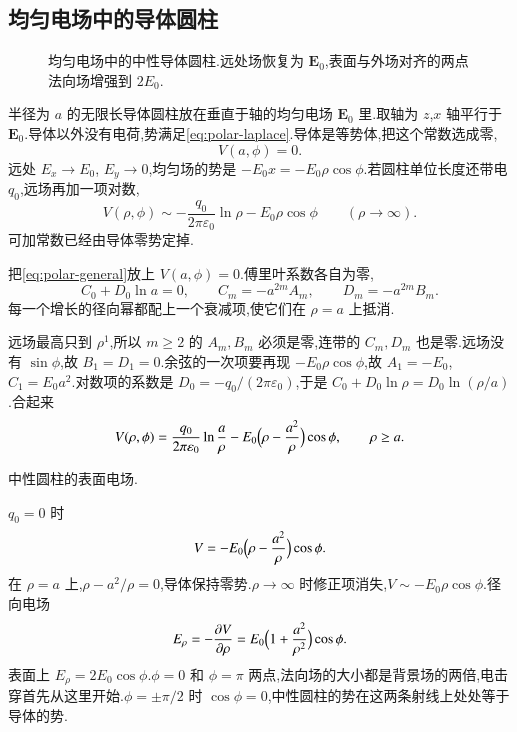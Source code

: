 \subsection{均匀电场中的导体圆柱}

\begin{figure}[htb]
  \centering
  
  \caption{均匀电场中的中性导体圆柱.远处场恢复为 $\mathbf{E}_0$,表面与外场对齐的两点法向场增强到 $2E_0$.}
  \label{fig:cylinder-field}
\end{figure}

半径为 $a$ 的无限长导体圆柱放在垂直于轴的均匀电场 $\mathbf{E}_0$ 里.取轴为 $z$,$x$ 轴平行于 $\mathbf{E}_0$.导体以外没有电荷,势满足\eqref{eq:polar-laplace}.导体是等势体,把这个常数选成零,
\begin{equation}
  V(a,\phi)=0.
\end{equation}
远处 $E_x\to E_0$, $E_y\to 0$,均匀场的势是 $-E_0 x=-E_0\rho\cos\phi$.若圆柱单位长度还带电 $q_0$,远场再加一项对数,
\begin{equation}
  V(\rho,\phi)\sim
  -\frac{q_0}{2\pi\varepsilon_0}\ln\rho
  -E_0\rho\cos\phi
  \qquad(\rho\to\infty).
\end{equation}
可加常数已经由导体零势定掉.

把\eqref{eq:polar-general}放上 $V(a,\phi)=0$.傅里叶系数各自为零,
\begin{equation}
  C_0+D_0\ln a=0,
  \qquad
  C_m=-a^{2m}A_m,
  \qquad
  D_m=-a^{2m}B_m.
\end{equation}
每一个增长的径向幂都配上一个衰减项,使它们在 $\rho=a$ 上抵消.

远场最高只到 $\rho^1$,所以 $m\geq 2$ 的 $A_m,B_m$ 必须是零,连带的 $C_m,D_m$ 也是零.远场没有 $\sin\phi$,故 $B_1=D_1=0$.余弦的一次项要再现 $-E_0\rho\cos\phi$,故 $A_1=-E_0$, $C_1=E_0 a^2$.对数项的系数是 $D_0=-q_0/(2\pi\varepsilon_0)$,于是 $C_0+D_0\ln\rho=D_0\ln(\rho/a)$.合起来
\begin{equation}
  V(\rho,\phi)
  =\frac{q_0}{2\pi\varepsilon_0}\ln\frac{a}{\rho}
  -E_0\Bigl(\rho-\frac{a^2}{\rho}\Bigr)\cos\phi,
  \qquad\rho\geq a.
  \label{eq:cylinder-potential}
\end{equation}

\begin{example}
中性圆柱的表面电场.
\end{example}
\begin{solution}
$q_0=0$ 时
\begin{equation}
  V=-E_0\Bigl(\rho-\frac{a^2}{\rho}\Bigr)\cos\phi.
\end{equation}
在 $\rho=a$ 上,$\rho-a^2/\rho=0$,导体保持零势.$\rho\to\infty$ 时修正项消失,$V\sim -E_0\rho\cos\phi$.径向电场
\begin{equation}
  E_{\rho}=-\frac{\partial V}{\partial\rho}
  =E_0\Bigl(1+\frac{a^2}{\rho^2}\Bigr)\cos\phi.
\end{equation}
表面上 $E_{\rho}=2E_0\cos\phi$.$\phi=0$ 和 $\phi=\pi$ 两点,法向场的大小都是背景场的两倍,电击穿首先从这里开始.$\phi=\pm\pi/2$ 时 $\cos\phi=0$,中性圆柱的势在这两条射线上处处等于导体的势.
\end{solution}

